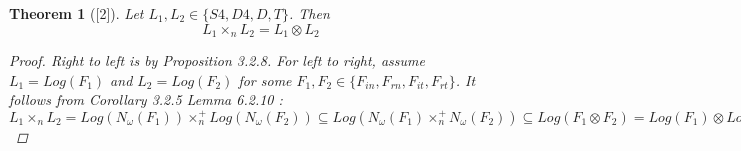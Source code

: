 \documentclass[12pt, a4paper]{scrartcl}
\newtheorem{theorem}[definition]{Theorem}
\begin{document}
    \begin{theorem}[\textnormal{[2]}]
        Let $L_1, L_2 \in \{S4, D4, D, T\}$. Then 
        $$L_1 \times_n L_2 = L_1 \otimes L_2$$

        \begin{proof}
            Right to left is by Proposition 3.2.8. \newline
            For left to right, assume $L_1 = Log(F_1)$ and $L_2 = Log(F_2)$ for some $F_1, F_2 \in \{F_{in}, F_{rn}, F_{it}, F_{rt}\}$. \newline \newline
            It follows from Corollary 3.2.5 Lemma 6.2.10 : \newline 
            $L_1 \times_n L_2 = Log(N_\omega(F_1)) \times^+_n Log(N_\omega(F_2)) \subseteq Log(N_\omega(F_1) \times^+_n N_\omega(F_2)) \subseteq Log(F_1 \otimes F_2) = Log(F_1) \otimes Log(F_2) = L_1 \otimes L_2$
        \end{proof}
    \end{theorem}
\end{document}
